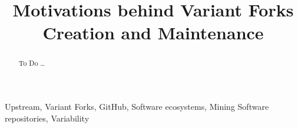 \documentclass[10pt,conference]{IEEEtran}
\begin{document}
\title{Motivations behind Variant Forks Creation and Maintenance}

	
\maketitle

\begin{abstract}
To Do \ldots
\end{abstract}

\begin{IEEEkeywords}
Upstream, Variant Forks, GitHub, Software ecosystems, Mining Software repositories, Variability
\end{IEEEkeywords}








 

\typeout{}

\end{document}
